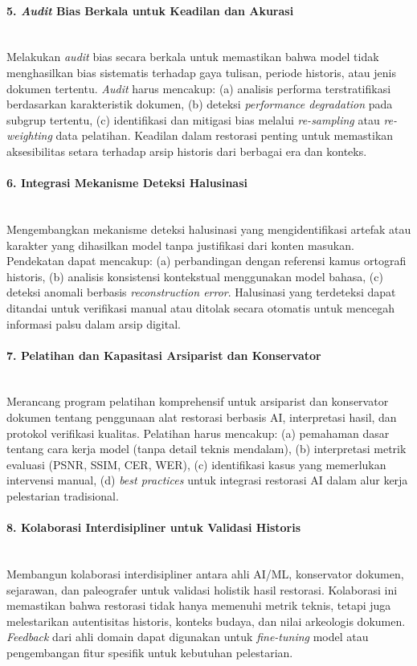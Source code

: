 \documentclass[12pt,a4paper]{article}
\begin{document}
\paragraph{5. \textit{Audit} Bias Berkala untuk Keadilan dan Akurasi} \mbox{}\\[0.1em]
Melakukan \textit{audit} bias secara berkala untuk memastikan bahwa model tidak menghasilkan bias sistematis terhadap gaya tulisan, periode historis, atau jenis dokumen tertentu. \textit{Audit} harus mencakup: (a) analisis performa terstratifikasi berdasarkan karakteristik dokumen, (b) deteksi \textit{performance degradation} pada subgrup tertentu, (c) identifikasi dan mitigasi bias melalui \textit{re-sampling} atau \textit{re-weighting} data pelatihan. Keadilan dalam restorasi penting untuk memastikan aksesibilitas setara terhadap arsip historis dari berbagai era dan konteks.

\paragraph{6. Integrasi Mekanisme Deteksi Halusinasi} \mbox{}\\[0.1em]
Mengembangkan mekanisme deteksi halusinasi yang mengidentifikasi artefak atau karakter yang dihasilkan model tanpa justifikasi dari konten masukan. Pendekatan dapat mencakup: (a) perbandingan dengan referensi kamus ortografi historis, (b) analisis konsistensi kontekstual menggunakan model bahasa, (c) deteksi anomali berbasis \textit{reconstruction error}. Halusinasi yang terdeteksi dapat ditandai untuk verifikasi manual atau ditolak secara otomatis untuk mencegah informasi palsu dalam arsip digital.

\paragraph{7. Pelatihan dan Kapasitasi Arsiparist dan Konservator} \mbox{}\\[0.1em]
Merancang program pelatihan komprehensif untuk arsiparist dan konservator dokumen tentang penggunaan alat restorasi berbasis AI, interpretasi hasil, dan protokol verifikasi kualitas. Pelatihan harus mencakup: (a) pemahaman dasar tentang cara kerja model (tanpa detail teknis mendalam), (b) interpretasi metrik evaluasi (PSNR, SSIM, CER, WER), (c) identifikasi kasus yang memerlukan intervensi manual, (d) \textit{best practices} untuk integrasi restorasi AI dalam alur kerja pelestarian tradisional.

\paragraph{8. Kolaborasi Interdisipliner untuk Validasi Historis} \mbox{}\\[0.1em]
Membangun kolaborasi interdisipliner antara ahli AI/ML, konservator dokumen, sejarawan, dan paleografer untuk validasi holistik hasil restorasi. Kolaborasi ini memastikan bahwa restorasi tidak hanya memenuhi metrik teknis, tetapi juga melestarikan autentisitas historis, konteks budaya, dan nilai arkeologis dokumen. \textit{Feedback} dari ahli domain dapat digunakan untuk \textit{fine-tuning} model atau pengembangan fitur spesifik untuk kebutuhan pelestarian.
\end{document}
